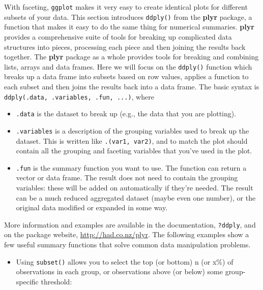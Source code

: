 
With faceting, \texttt{ggplot} makes it very easy to create identical
plots for different subsets of your data.  This
section introduces \texttt{ddply()} from the \textbf{plyr} package, a
function that makes it easy to do the same thing for numerical
summaries. \textbf{plyr} provides a comprehensive suite of tools for
breaking up complicated data structures into pieces, processing each
piece and then joining the results back together. The \textbf{plyr}
package as a whole provides tools for breaking and combining lists,
arrays and data frames. Here we will focus on the \texttt{ddply()}
function which breaks up a data frame into subsets based on row values,
applies a function to each subset and then joins the results back into a
data frame. The basic syntax is
\texttt{ddply(.data, .variables, .fun, ...)}, where 

\begin{itemize}
\itemsep1pt\parskip0pt
\item
  \texttt{.data} is the dataset to break up (e.g., the data that you are
  plotting).
\item
  \texttt{.variables} is a description of the grouping variables used to
  break up the dataset. This is written like \texttt{.(var1, var2)}, and
  to match the plot should contain all the grouping and faceting
  variables that you've used in the plot.
\item
  \texttt{.fun} is the summary function you want to use. The function
  can return a vector or data frame. The result does not need to contain
  the grouping variables: these will be added on automatically if
  they're needed. The result can be a much reduced aggregated dataset
  (maybe even one number), or the original data modified or expanded in
  some way.
\end{itemize}

More information and examples are available in the documentation,
\texttt{?ddply}, and on the package website,
\url{http://had.co.nz/plyr}. The following examples show a few useful
summary functions that solve common data manipulation problems.

\begin{itemize}
\itemsep1pt\parskip0pt
\item
  Using \texttt{subset()} allows you to select the top (or bottom) n (or
  x\%) of observations in each group, or observations above (or below)
  some group-specific threshold: 
\end{itemize}

